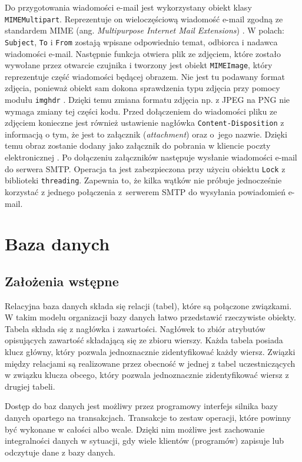 \documentclass[a4paper,11pt,twoside]{article}
\begin{document}
Do przygotowania wiadomości e-mail jest wykorzystany obiekt klasy \texttt{MIMEMultipart}. Reprezentuje on wieloczęściową wiadomość e-mail zgodną ze standardem MIME (ang. \textit{Multipurpose Internet Mail Extensions}) \cite{mime1}\cite{mime2}.  W polach: \texttt{Subject}, \texttt{To} i \texttt{From} zostają wpisane odpowiednio temat, odbiorca i nadawca wiadomości e-mail. Następnie funkcja otwiera plik ze zdjęciem, które zostało wywołane przez otwarcie czujnika i tworzony jest obiekt \texttt{MIMEImage}, który reprezentuje część wiadomości będącej obrazem. Nie jest tu podawany format zdjęcia, ponieważ obiekt sam dokona sprawdzenia typu zdjęcia przy pomocy modułu \texttt{imghdr} \cite{python-mime}. Dzięki temu zmiana formatu zdjęcia np. z JPEG na PNG nie wymaga zmiany tej części kodu. Przed dołączeniem do wiadomości pliku ze zdjęciem konieczne jest również ustawienie nagłówka \texttt{Content-Disposition} z informacją o tym, że jest to załącznik (\textit{attachment}) oraz o~jego nazwie. Dzięki temu obraz zostanie dodany jako załącznik do pobrania w kliencie poczty elektronicznej \cite{content-disposition}. Po dołączeniu załączników następuje wysłanie wiadomości e-mail do serwera SMTP. Operacja ta jest zabezpieczona przy użyciu obiektu \texttt{Lock} z biblioteki \texttt{threading}. Zapewnia to, że kilka wątków nie próbuje jednocześnie korzystać z jednego połączenia z~serwerem SMTP do wysyłania powiadomień e-mail.
\newpage

\section{Baza danych}
\subsection{Założenia wstępne}
Relacyjna baza danych składa się relacji (tabel), które są połączone związkami. W takim modelu organizacji bazy danych łatwo przedstawić rzeczywiste obiekty. Tabela składa się z nagłówka i zawartości. Nagłówek to zbiór atrybutów opisujących zawartość składającą się ze zbioru wierszy. Każda tabela posiada klucz główny, który pozwala jednoznacznie zidentyfikować każdy wiersz. Związki między relacjami są realizowane przez obecność w jednej z tabel uczestniczących w związku klucza obcego, który pozwala jednoznacznie zidentyfikować wiersz z drugiej tabeli.

Dostęp do baz danych jest możliwy przez programowy interfejs silnika bazy danych opartego na transakcjach. Transakcje to zestaw operacji, które powinny być wykonane w całości albo wcale. Dzięki nim możliwe jest zachowanie integralności danych w sytuacji, gdy wiele klientów (programów) zapisuje lub odczytuje dane z bazy danych.
\end{document}

